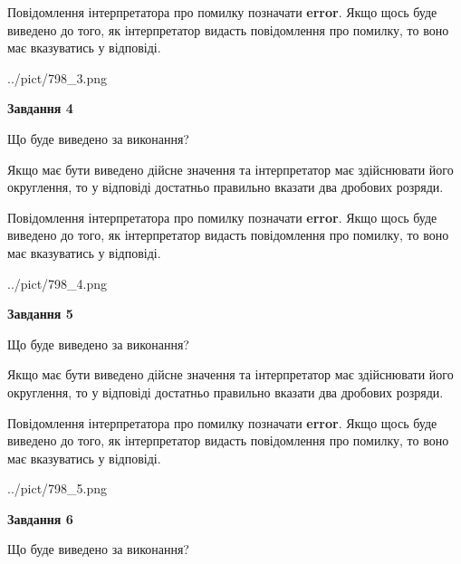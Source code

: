 \documentclass[12pt, ukrainian]{article}
\begin{document}
{\begin {Large}
Повідомлення інтерпретатора про помилку позначати \textbf{error}.
Якщо щось буде виведено до того, як інтерпретатор видасть повідомлення про помилку, 
то воно має вказуватись у відповіді. \par

\begin{center}
	{../pict/798_3.png}
\end{center}
\newpage

{\begin {center}\textbf{Завдання 4}\end {center}}\par
Що буде виведено за виконання? \par

Якщо має бути виведено дійсне значення та інтерпретатор має здійснювати його округлення, 
то у відповіді достатньо правильно вказати два дробових розряди.

Повідомлення інтерпретатора про помилку позначати \textbf{error}.
Якщо щось буде виведено до того, як інтерпретатор видасть повідомлення про помилку, 
то воно має вказуватись у відповіді. \par

\begin{center}
	{../pict/798_4.png}
\end{center}
\newpage

{\begin {center}\textbf{Завдання 5}\end {center}}\par
Що буде виведено за виконання? \par

Якщо має бути виведено дійсне значення та інтерпретатор має здійснювати його округлення, 
то у відповіді достатньо правильно вказати два дробових розряди.

Повідомлення інтерпретатора про помилку позначати \textbf{error}.
Якщо щось буде виведено до того, як інтерпретатор видасть повідомлення про помилку, 
то воно має вказуватись у відповіді. \par

\begin{center}
	{../pict/798_5.png}
\end{center}
\newpage

{\begin {center}\textbf{Завдання 6}\end {center}}\par
Що буде виведено за виконання? \par


\end{Large}}
\end{document}
